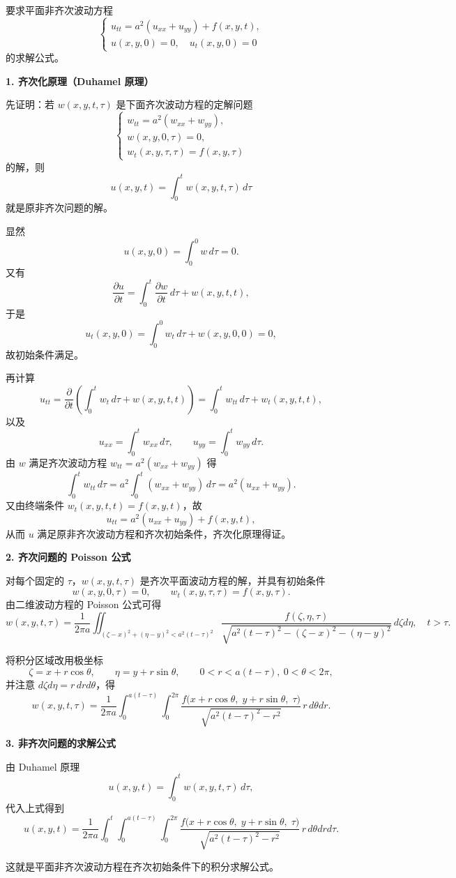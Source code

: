 \begin{solution}
要求平面非齐次波动方程
\[
\begin{cases}
u_{tt}=a^{2}(u_{xx}+u_{yy})+f(x,y,t),\\[3pt]
u(x,y,0)=0,\quad u_t(x,y,0)=0
\end{cases}
\]
的求解公式。

\medskip\noindent
\textbf{1. 齐次化原理（Duhamel 原理）}

先证明：若 $w(x,y,t,\tau)$ 是下面齐次波动方程的定解问题
\[
\begin{cases}
w_{tt}=a^{2}(w_{xx}+w_{yy}),\\[3pt]
w(x,y,0,\tau)=0,\\[3pt]
w_t(x,y,\tau,\tau)=f(x,y,\tau)
\end{cases}
\]
的解，则
\[
u(x,y,t)=\displaystyle\int_{0}^{t} w(x,y,t,\tau)\,d\tau
\]
就是原非齐次问题的解。

\medskip
显然
\[
u(x,y,0)=\int_{0}^{0} w\,d\tau =0.
\]
又有
\[
\frac{\partial u}{\partial t}
=\int_{0}^{t}\frac{\partial w}{\partial t}\,d\tau + w(x,y,t,t),
\]
于是
\[
u_t(x,y,0)=\int_{0}^{0} w_t\,d\tau + w(x,y,0,0)=0,
\]
故初始条件满足。

再计算
\[
u_{tt}
=\frac{\partial}{\partial t}\left( \int_{0}^{t} w_t\,d\tau + w(x,y,t,t)\right)
=\int_{0}^{t} w_{tt}\,d\tau + w_t(x,y,t,t),
\]
以及
\[
u_{xx} = \int_{0}^{t} w_{xx}\,d\tau,\qquad
u_{yy} = \int_{0}^{t} w_{yy}\,d\tau.
\]
由 $w$ 满足齐次波动方程 $w_{tt}=a^{2}(w_{xx}+w_{yy})$ 得
\[
\int_{0}^{t} w_{tt}\,d\tau
=a^{2}\int_{0}^{t}(w_{xx}+w_{yy})\,d\tau
=a^{2}(u_{xx}+u_{yy}).
\]
又由终端条件 $w_t(x,y,t,t)=f(x,y,t)$，故
\[
u_{tt}=a^{2}(u_{xx}+u_{yy})+f(x,y,t),
\]
从而 $u$ 满足原非齐次波动方程和齐次初始条件，齐次化原理得证。

\medskip\noindent
\textbf{2. 齐次问题的 Poisson 公式}

对每个固定的 $\tau$，$w(x,y,t,\tau)$ 是齐次平面波动方程的解，并具有初始条件
\[
w(x,y,0,\tau)=0,\qquad w_t(x,y,\tau,\tau)=f(x,y,\tau).
\]
由二维波动方程的 Poisson 公式可得
\[
w(x,y,t,\tau)
=\frac{1}{2\pi a}
\iint_{(\zeta-x)^{2}+(\eta-y)^{2}<a^{2}(t-\tau)^{2}}
\frac{f(\zeta,\eta,\tau)}{\sqrt{a^{2}(t-\tau)^{2}-(\zeta-x)^{2}-(\eta-y)^{2}}}
\,d\zeta d\eta,
\quad t>\tau.
\]

将积分区域改用极坐标
\[
\zeta=x+r\cos\theta,\qquad
\eta =y+r\sin\theta,\qquad
0<r<a(t-\tau),\ 0<\theta<2\pi,
\]
并注意 $d\zeta d\eta = r\,dr d\theta$，得
\[
w(x,y,t,\tau)
=\frac{1}{2\pi a}
\int_{0}^{a(t-\tau)}\int_{0}^{2\pi}
\frac{f\bigl(x+r\cos\theta,\;y+r\sin\theta,\;\tau\bigr)}
{\sqrt{a^{2}(t-\tau)^{2}-r^{2}}}\,r\,d\theta dr.
\]

\medskip\noindent
\textbf{3. 非齐次问题的求解公式}

由 Duhamel 原理
\[
u(x,y,t)=\int_{0}^{t} w(x,y,t,\tau)\,d\tau,
\]
代入上式得到
\[
u(x,y,t)
=\frac{1}{2\pi a}
\int_{0}^{t}\int_{0}^{a(t-\tau)}\int_{0}^{2\pi}
\frac{f\bigl(x+r\cos\theta,\;y+r\sin\theta,\;\tau\bigr)}
{\sqrt{a^{2}(t-\tau)^{2}-r^{2}}}\,
r\,d\theta dr d\tau.
\]

这就是平面非齐次波动方程在齐次初始条件下的积分求解公式。
\end{solution}

